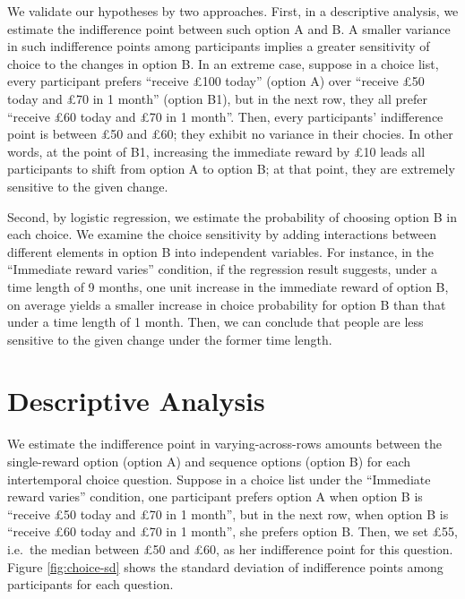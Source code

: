 \documentclass[
  12pt,
]{article}
\begin{document}
We validate our hypotheses by two approaches. First, in a descriptive
analysis, we estimate the indifference point between such option A and
B. A smaller variance in such indifference points among participants
implies a greater sensitivity of choice to the changes in option B. In
an extreme case, suppose in a choice list, every participant prefers
``receive £100 today'' (option A) over ``receive £50 today and £70 in 1
month'' (option B1), but in the next row, they all prefer ``receive £60
today and £70 in 1 month''. Then, every participants' indifference point
is between £50 and £60; they exhibit no variance in their chocies. In
other words, at the point of B1, increasing the immediate reward by £10
leads all participants to shift from option A to option B; at that
point, they are extremely sensitive to the given change.

Second, by logistic regression, we estimate the probability of choosing
option B in each choice. We examine the choice sensitivity by adding
interactions between different elements in option B into independent
variables. For instance, in the ``Immediate reward varies'' condition,
if the regression result suggests, under a time length of 9 months, one
unit increase in the immediate reward of option B, on average yields a
smaller increase in choice probability for option B than that under a
time length of 1 month. Then, we can conclude that people are less
sensitive to the given change under the former time length.

\hypertarget{descriptive-analysis}{%
\section{Descriptive Analysis}\label{descriptive-analysis}}

We estimate the indifference point in varying-across-rows amounts
between the single-reward option (option A) and sequence options (option
B) for each intertemporal choice question. Suppose in a choice list
under the ``Immediate reward varies'' condition, one participant prefers
option A when option B is ``receive £50 today and £70 in 1 month'', but
in the next row, when option B is ``receive £60 today and £70 in 1
month'', she prefers option B. Then, we set £55, i.e.~the median between
£50 and £60, as her indifference point for this question. Figure
\ref{fig:choice-sd} shows the standard deviation of indifference points
among participants for each question.
\end{document}
